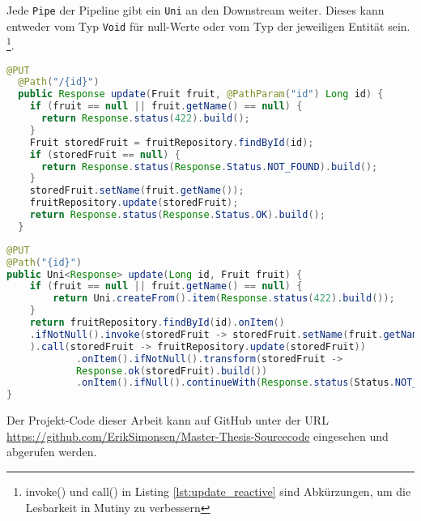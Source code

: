 Jede \verb|Pipe| der Pipeline gibt ein \verb|Uni| an den Downstream weiter.
Dieses kann entweder vom Typ \verb|Void| für null-Werte oder vom Typ der jeweiligen Entität sein.
\footnote{invoke() und call() in Listing \ref{lst:update_reactive} sind Abkürzungen, um die Lesbarkeit in Mutiny zu verbessern\parencite{MutinyShortcuts}}.

\begin{lstlisting}[caption=Update Methode der nicht-reaktiven Anwendung, language=Java, captionpos=b, label=lst:update_blocking]
  @PUT
  @Path("/{id}")
  public Response update(Fruit fruit, @PathParam("id") Long id) {
    if (fruit == null || fruit.getName() == null) {
      return Response.status(422).build();
    }
    Fruit storedFruit = fruitRepository.findById(id);
    if (storedFruit == null) {
      return Response.status(Response.Status.NOT_FOUND).build();
    }
    storedFruit.setName(fruit.getName());
    fruitRepository.update(storedFruit);
    return Response.status(Response.Status.OK).build();
  }
\end{lstlisting}

\begin{lstlisting}[caption=Update Methode der reaktiven Anwendung, language=Java, captionpos=b, label=lst:update_reactive]
@PUT
@Path("{id}")
public Uni<Response> update(Long id, Fruit fruit) {
	if (fruit == null || fruit.getName() == null) {
		return Uni.createFrom().item(Response.status(422).build());
	}
	return fruitRepository.findById(id).onItem()
	.ifNotNull().invoke(storedFruit -> storedFruit.setName(fruit.getName())
	).call(storedFruit -> fruitRepository.update(storedFruit))
			.onItem().ifNotNull().transform(storedFruit ->
			Response.ok(storedFruit).build())
			.onItem().ifNull().continueWith(Response.status(Status.NOT_FOUND).build());
}
\end{lstlisting}
Der Projekt-Code dieser Arbeit kann auf GitHub unter der URL \url{https://github.com/ErikSimonsen/Master-Thesis-Sourcecode} eingesehen und abgerufen werden.
\newpage
